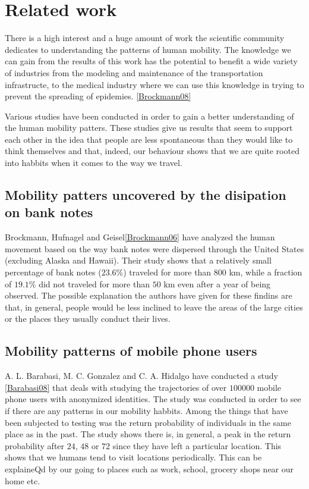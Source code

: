 \chapter{Related work}
There is a high interest and a huge amount of work the scientific community
dedicates to understanding the patterns of human mobility. The knowledge we
can gain from the results of this work has the potential to benefit a wide
variety of industries from the modeling and maintenance of the transportation infrastructe,
to the medical industry where we can use this knowledge in trying to prevent the
spreading of epidemies. \ref{Brockmann08} %

Various studies have been conducted in order to gain a better understanding of
the human mobility patters. These studies give us results that seem to support
each other in the idea that people are less spontaneous than they would like to
think themselves and that, indeed, our behaviour shows that we are quite rooted
into habbits when it comes to the way we travel.

\section{Mobility patters uncovered by the disipation on bank notes}
Brockmann, Hufnagel and Geisel\ref{Brockmann06} have
analyzed the human movement based on the way bank notes were dispersed through
the United States (excluding Alaska and Hawaii). Their study shows that a
relatively small percentage of bank notes ($23.6\%$) traveled for more than
$800$ km, while a fraction of $19.1\%$ did not traveled for more than $50$ km
even after a year of being observed. The possible explanation the authors have
given for these findins are that, in general, people would be less inclined to
leave the areas of the large cities or the places they usually conduct their
lives.

\section{Mobility patterns of mobile phone users}
A. L. Barabasi, M. C. Gonzalez and C. A. Hidalgo have conducted a study
\ref{Barabasi08} that deals with studying the trajectories of over $100000$
mobile phone users with anonymized identities. The study was conducted in order
to see if there are any patterns in our mobility habbits. Among the things that
have been subjected to testing was the return probability of individuals in the
same place as in the past. The study shows there is, in general, a peak in the
return probability after $24$, $48$ or $72$ since they have left a particular
location. This shows that we humans tend to visit locations periodically. This
can be explaineQd by our going to places such as work, school, grocery shops
near our home etc.


